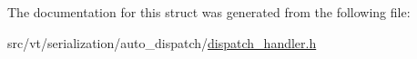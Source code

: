 The documentation for this struct was generated from the following file\+:\begin{DoxyCompactItemize}
\item 
src/vt/serialization/auto\+\_\+dispatch/\hyperlink{dispatch__handler_8h}{dispatch\+\_\+handler.\+h}\end{DoxyCompactItemize}
